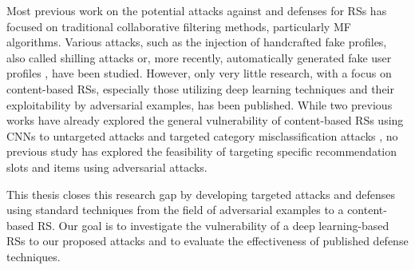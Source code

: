 Most previous work on the potential attacks against and defenses for \acp{RS} has focused on traditional collaborative filtering methods, particularly \ac{MF} algorithms. Various attacks, such as the injection of handcrafted fake profiles, also called shilling attacks \parencite{chirita2005preventing} or, more recently, automatically generated fake user profiles \parencite{christakopoulou2019adversarial}, have been studied. However, only very little research, with a focus on content-based \acp{RS}, especially those utilizing deep learning techniques and their exploitability by adversarial examples, has been published. While two previous works have already explored the general vulnerability of content-based \acp{RS} using \acp{CNN} to untargeted attacks \parencite{tang2019adversarial} and targeted category misclassification attacks \parencite{di2020taamr}, no previous study has explored the feasibility of targeting specific recommendation slots and items using adversarial attacks. 

This thesis closes this research gap by developing targeted attacks and defenses using standard techniques from the field of adversarial examples to a content-based \ac{RS}. Our goal is to investigate the vulnerability of a deep learning-based \acp{RS} to our proposed attacks and to evaluate the effectiveness of published defense techniques.

